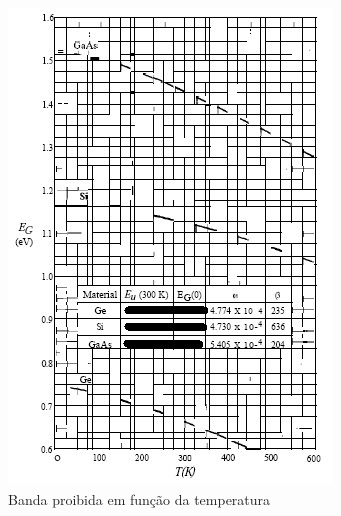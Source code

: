 \documentclass[12pt,a4paper,titlepage]{report}
\begin{document}
\begin{enumerate}
\begin{figure}[h]
\centering
\includegraphics[scale=0.8]{Egf(T)}
\caption{\footnotesize Banda proibida em fun\c c\~ao da temperatura}
\label{f1}
\end{figure}

\end{enumerate}
\end{document}
